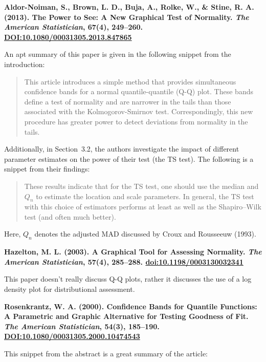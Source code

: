 \documentclass{article}
\begin{document}
\textbf{Aldor-Noiman, S., Brown, L. D., Buja, A., Rolke, W., \& Stine, R. A. (2013). The Power to See: A New Graphical Test of Normality. \emph{The American Statistician}, 67(4), 249--260. \url{DOI:10.1080/00031305.2013.847865}}

An apt summary of this paper is given in the following snippet from the introduction:
\begin{quote}
This article introduces a simple method that provides simultaneous confidence bands for a normal quantile-quantile (Q-Q) plot. These bands define a test of normality and are narrower in the tails than those associated with the Kolmogorov-Smirnov test. Correspondingly, this new procedure has greater power to detect deviations from normality in the tails.
\end{quote}

Additionally, in Section~3.2, the authors investigate the impact of different parameter estimates on the power of their test (the TS test). The following is a snippet from their findings:

\begin{quote}
These results indicate that for the TS test, one should use the median and $Q_n$ to estimate the location and scale parameters. In general, the TS test with this choice of estimators performs at least as well as the Shapiro--Wilk test (and often much better).
\end{quote}

Here, $Q_n$ denotes the adjusted MAD discussed by Croux and Rousseeuw (1993).

\bigskip


{\bf Hazelton, M. L. (2003). A Graphical Tool for Assessing Normality. \emph{The American Statistician}, 57(4), 285--288. \url{doi:10.1198/0003130032341}}

This paper doesn't really discuss Q-Q plots, rather it discusses the use of a log density plot for distributional assessment.

\bigskip

{\bf Rosenkrantz, W. A. (2000). Confidence Bands for Quantile Functions: A Parametric and Graphic Alternative for Testing Goodness of Fit. \emph{The American Statistician}, 54(3), 185--190. \url{DOI:10.1080/00031305.2000.10474543}}

This snippet from the abstract is a great summary of the article:
\end{document}
